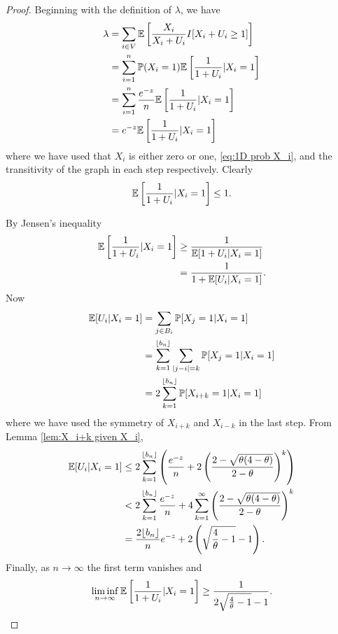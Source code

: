 	\begin{proof}
	Beginning with the definition of $\lambda$, we have
		\begin{align}
			\lambda &= \sum_{i \in V} \mathbb{E}\left[\frac{X_i}{X_i + U_i} I[ X_i + U_i \geq 1] \right]\\
				&= \sum_{i = 1}^n \mathbb{P}(X_i = 1) \mathbb{E} \left[\frac{1}{1 + U_i}| X_i = 1\right]\\
				&= \sum_{i = 1}^n \frac{e^{-z}}{n} \mathbb{E} \left[\frac{1}{1 + U_i}| X_i = 1\right]\\
				&= e^{-z} \mathbb{E} \left[\frac{1}{1 + U_i}| X_i = 1\right]
		\end{align}
		where we have used that $X_i$ is either zero or one, \eqref{eq:1D prob X_i}, and the transitivity of the graph in each step respectively.
		Clearly 
		\begin{align}
			\mathbb{E} \left[\frac{1}{1 + U_i}| X_i = 1\right] \leq 1.
		\end{align}

		By Jensen's inequality
		\begin{align}
			\mathbb{E} \left[\frac{1}{1 + U_i}| X_i = 1\right] &\geq \frac{1}{\mathbb{E}[1 + U_i | X_i = 1]}\\
				&= \frac{1}{1 + \mathbb{E}[U_i | X_i = 1]}.
		\end{align}
		Now
		\begin{align}
			\mathbb{E}[U_i | X_i = 1] &= \sum_{j \in B_i} \mathbb{P}[X_j = 1| X_i = 1]\\
				&= \sum_{k=1}^{\lfloor b_n\rfloor} \sum_{|j - i| = k} \mathbb{P}[X_j = 1| X_i = 1]\\
				&= 2 \sum_{k=1}^{\lfloor b_n\rfloor} \mathbb{P}[X_{i+k} = 1 | X_i = 1]
		\end{align}
		where we have used the symmetry of $X_{i+k}$ and $X_{i -k}$ in the last step. From Lemma \ref{lem:X_i+k given X_i}, 
		\begin{align}
			\mathbb{E}[U_i | X_i = 1] &\leq 2 \sum_{k = 1}^{\lfloor b_n\rfloor} \left(\frac{e^{-z}}{n} + 2 \left(\frac{2 - \sqrt{\theta(4 - \theta)}}{2 - \theta}\right)^k\right)\\
				&< 2 \sum_{k = 1}^{\lfloor b_n\rfloor} \frac{e^{-z}}{n} + 4\sum_{k = 1}^\infty \left(\frac{2 - \sqrt{\theta(4 - \theta)}}{2 - \theta}\right)^k\\
				&= \frac{2 \lfloor b_n\rfloor}{n}e^{-z} + 2\left(\sqrt{\frac{4}{\theta} - 1} - 1\right).
		\end{align}
		Finally, as $n \rightarrow \infty$ the first term vanishes and
		\begin{align}
			\liminf_{n \rightarrow \infty} \mathbb{E} \left[\frac{1}{1 + U_i}| X_i = 1\right] \geq \frac{1}{2\sqrt{\frac{4}{\theta} - 1} - 1}.
		\end{align}
	\end{proof}
	
